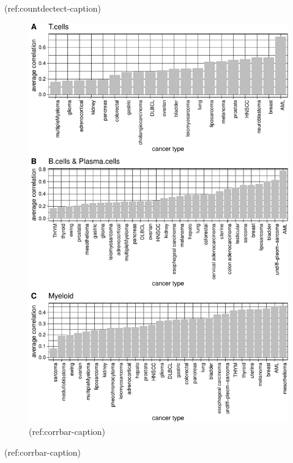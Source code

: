 \documentclass[12pt,]{book}
\theoremstyle{definition}
\theoremstyle{definition}
\theoremstyle{definition}
\theoremstyle{remark}
\begin{document}
(ref:countdectect-caption)

\begin{figure}

{\centering \includegraphics{UCzPhDThesis_files/figure-latex/corrbar-1} 

}

\caption[Correlation of cell-type metagenes with the refrence profiles]{(ref:corrbar-caption)}\label{fig:corrbar}
\end{figure}

(ref:corrbar-caption)
\end{document}
